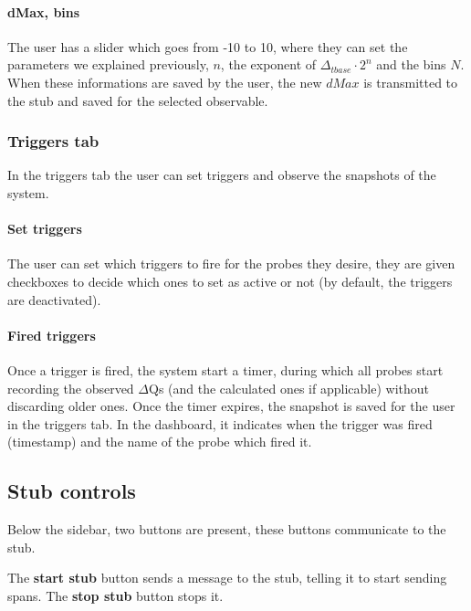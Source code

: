     \paragraph{dMax, bins}
        The user has a slider which goes from -10 to 10, where they can set the parameters we explained previously, $n$, the exponent of $\Delta_{tbase} \cdot 2^n$ and the bins $N$. When these informations are saved by the user, the new $dMax$ is transmitted to the stub and saved for the selected observable.

    \subsubsection{Triggers tab}
        In the triggers tab the user can set triggers and observe the snapshots of the system.

    \paragraph{Set triggers}
        The user can set which triggers to fire for the probes they desire, they are given checkboxes to decide which ones to set as active or not (by default, the triggers are deactivated).
    
    \paragraph{Fired triggers}
        Once a trigger is fired, the system start a timer, during which all probes start recording the observed $\Delta$Qs (and the calculated ones if applicable) without discarding older ones. Once the timer expires, the snapshot is saved for the user in the triggers tab. In the dashboard, it indicates when the trigger was fired (timestamp) and the name of the probe which fired it.

    \subsection{Stub controls}
        Below the sidebar, two buttons are present, these buttons communicate to the stub. 
         
        The \textbf{start stub} button sends a message to the stub, telling it to start sending spans. The \textbf{stop stub} button stops it.
